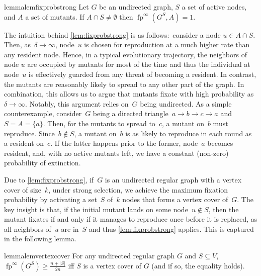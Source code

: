 \documentclass[letterpaper]{article}
\newcommand{\fp}{\operatorname{fp}}
\newcommand{\FitAdv}{\delta}
\begin{document}
\begin{restatable}{lemma}{lemfixprobstrong}\label{lem:fixprobstrong}
Let $G$ be an undirected graph, $S$ a set of active nodes, and $A$ a set of mutants. If  $A\cap S\neq \emptyset$ then $\fp^{\infty}(G^S, A)=1$.
\end{restatable}

The intuition behind \cref{lem:fixprobstrong} is as follows:~consider a node $u\in A\cap S$.
Then, as~$\FitAdv\to\infty$, node~$u$ is chosen for reproduction at a much higher rate than any resident node.
Hence, in a typical evolutionary trajectory, the neighbors of node $u$ are occupied by mutants for most of the time and thus the individual at node~$u$ is effectively guarded from any threat of becoming a resident.
In contrast, the mutants are reasonably likely to spread to any other part of the graph.
In combination, this allows us to argue that mutants fixate with high probability as~$\FitAdv\to\infty$.
Notably, this argument relies on~$G$ being undirected.
As a simple counterexample, consider~$G$ being a directed triangle~$a\to b\to c\to a$ and~$S = A = \{a\}$.
Then, for the mutants to spread to~$c$, a mutant on~$b$ must reproduce.
Since~$b\not \in S$, a mutant on~$b$ is as likely to reproduce in each round as a resident on~$c$.
If the latter happens prior to the former, node~$a$ becomes resident, and, with no active mutants left, we have a constant (non-zero) probability of extinction.

Due to \cref{lem:fixprobstrong}, if~$G$ is an undirected regular graph with a vertex cover of size~$k$, under strong selection, we achieve the maximum fixation probability by activating a set~$S$ of~$k$ nodes that forms a vertex cover of~$G$. The key insight is that, if the initial mutant lands on some node~$u\not \in S$, then the mutant fixates if and  only if it manages to reproduce once before it is replaced, as all neighbors of~$u$ are in~$S$ and thus \cref{lem:fixprobstrong} applies. This is captured in the following lemma.

\begin{restatable}{lemma}{lemvertexcover}\label{lem:vertex_cover}
For any undirected regular graph $G$ and $S\subseteq V$, $\fp^{\infty}(G^{S})\geq\frac{n+|S|}{2n}$ iff $S$ is a vertex cover of $G$ (and if so, the equality holds).
\end{restatable}
\end{document}
